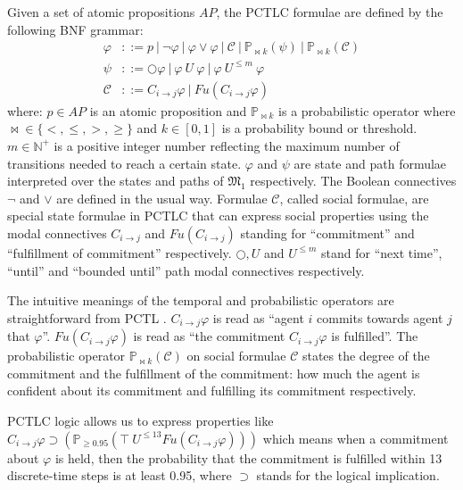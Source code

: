 \begin{definition}\label{def:syntax}
Given a set of atomic propositions $AP$, the PCTLC formulae are
defined by the following BNF grammar:
%
\begin{align*}
    \varphi & ::= p~|~\neg \varphi~|~\varphi \vee \varphi~|~\mathcal{C}~|~ \mathbb{P}_{\bowtie k} (\psi)~|~\mathbb{P}_{\bowtie k}(\mathcal{C})\\
    \psi & ::=\bigcirc \varphi ~ | ~ \varphi ~U~ \varphi~|~ \varphi~ U^{\leq m} ~ \varphi \\
    \mathcal{C} & ::= C_{i\rightarrow j}\varphi ~| ~ Fu(C_{i\rightarrow j}\varphi)
\end{align*}
%
where: $p\in AP$ is an atomic proposition and $\mathbb{P}_{\bowtie
k}$ is a probabilistic operator where $\bowtie \in\{<,\leq,>,\ge\}$ and $k\in [0,1]$ is a probability bound or threshold. $m \in\mathbb{N}^+ $ is a positive integer number reflecting the maximum number of transitions needed to reach a certain state. $\varphi$ and $\psi$ are state and path formulae interpreted over the states and paths of $\mathfrak{M_1}$ respectively. The
Boolean connectives $\neg$ and $\vee$ are defined in the usual
way. Formulae $\mathcal{C}$, called social formulae, are special
state formulae in PCTLC that can express social properties using
the modal connectives $C_{i\rightarrow j}$ and $Fu(C_{i\rightarrow
j})$ standing for ``commitment'' and ``fulfillment of commitment''
respectively. $\bigcirc, U$ and $U^{\leq m}$ stand for ``next time'',
``until'' and ``bounded until'' path modal connectives respectively.

\end{definition}

\noindent The intuitive meanings of the temporal and probabilistic operators are straightforward from PCTL \cite{Jonsson1991}. $C_{i\rightarrow j}\varphi$ is read as ``agent $i$ commits towards agent $j$ that $\varphi$''. $Fu(C_{i\rightarrow j}\varphi)$ is read as ``the commitment $C_{i\rightarrow j}\varphi$ is fulfilled''. The probabilistic operator $\mathbb{P}_{\bowtie k}(\mathcal{C})$ on social formulae $\mathcal{C}$ states the degree of the commitment and the
fulfillment of the commitment: how much the agent is confident
about its commitment and fulfilling its commitment respectively.

PCTLC logic allows us to express properties like $C_{i \rightarrow j} \varphi \supset (\mathbb{P}_{\ge 0.95}(\top~U^{\leq 13}Fu(C_{i\rightarrow j}\varphi)))$ which means when a commitment about $\varphi$ is
held, then the probability that the commitment is fulfilled within
13 discrete-time steps is at least 0.95, where $\supset$ stands
for the logical implication.



